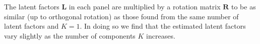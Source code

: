 \documentclass[twocolumn]{aastex61}
\newcommand{\todo}[1]{\textcolor{red}{#1}}
\newcommand{\vect}[1]{\boldsymbol{\mathbf{#1}}}
\renewcommand{\vec}[1]{\vect{#1}}
\newcommand{\transpose}{^\intercal}
\newcommand{\eye}{\textbf{I}}
\newcommand{\factorloads}{\textbf{L}}
\newcommand{\NumLatentFactors}{J}
\newcommand{\NumComponents}{K}
\begin{document}
The latent factors $\factorloads$ in each panel are multiplied by a rotation
matrix $\mathbf{R}$ to be as similar (up to orthogonal rotation) as those found
from the same number of latent factors and $\NumComponents  =  1$.
In doing so we find that the estimated latent factors vary slightly as
the number of components $\NumComponents$ increases.





\end{document}
